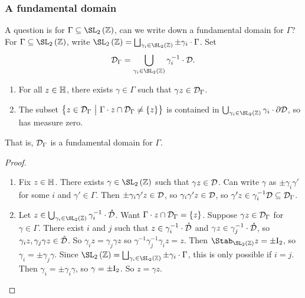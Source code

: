 \pagebreak

\subsubsection{A fundamental domain}

A question is for $ \Gamma \subseteq \SL_2\br{\ZZ} $, can we write down a fundamental domain for $ \Gamma $? For $ \Gamma \subseteq \SL_2\br{\ZZ} $, write $ \SL_2\br{\ZZ} = \bigsqcup_{\gamma_i \in \SL_2\br{\ZZ}} \pm\gamma_i \cdot \Gamma $. Set
$$ \DDD_\Gamma = \bigcup_{\gamma_i \in \SL_2\br{\ZZ}} \gamma_i^{-1} \cdot \DDD. $$

\begin{theorem}
\hfill
\begin{enumerate}
\item For all $ z \in \mathbb{H} $, there exists $ \gamma \in \Gamma $ such that $ \gamma z \in \mathcal{D}_\Gamma $.
\item The subset $ \cbr{z \in \DDD_\Gamma \st \Gamma \cdot z \cap \DDD_\Gamma \ne \cbr{z}} $ is contained in $ \bigcup_{\gamma_i \in \SL_2\br{\ZZ}} \gamma_i \cdot \partial\DDD $, so has measure zero.
\end{enumerate}
That is, $ \mathcal{D}_\Gamma $ is a fundamental domain for $ \Gamma $.
\end{theorem}

\begin{proof}
\hfill
\begin{enumerate}
\item Fix $ z \in \mathbb{H} $. There exists $ \gamma \in \SL_2\br{\ZZ} $ such that $ \gamma z \in \mathcal{D} $. Can write $ \gamma $ as $ \pm\gamma_i\gamma' $ for some $ i $ and $ \gamma' \in \Gamma $. Then $ \pm\gamma_i\gamma'z \in \mathcal{D} $, so $ \gamma_i\gamma'z \in \mathcal{D} $, so $ \gamma'z \in \gamma_i^{-1}\mathcal{D} \subseteq \mathcal{D}_\Gamma $.
\item Let $ z \in \bigcup_{\gamma_i \in \SL_2\br{\ZZ}} \gamma_i^{-1} \cdot \mathring{\DDD} $. Want $ \Gamma \cdot z \cap \DDD_\Gamma = \cbr{z} $. Suppose $ \gamma z \in \mathcal{D}_\Gamma $ for $ \gamma \in \Gamma $. There exist $ i $ and $ j $ such that $ z \in \gamma_i^{-1} \cdot \mathring{\mathcal{D}} $ and $ \gamma z \in \gamma_j^{-1} \cdot \mathring{\mathcal{D}} $, so $ \gamma_iz, \gamma_j\gamma z \in \mathring{\mathcal{D}} $. So $ \gamma_iz = \gamma_j\gamma z $ so $ \gamma^{-1}\gamma_j^{-1}\gamma_iz = z $. Then $ \Stab_{\SL_2\br{\ZZ}} z = \pm\I_2 $, so $ \gamma_i = \pm\gamma_j\gamma $. Since $ \SL_2\br{\ZZ} = \bigsqcup_{\gamma_i \in \SL_2\br{\ZZ}} \pm\gamma_i \cdot \Gamma $, this is only possible if $ i = j $. Then $ \gamma_i = \pm\gamma_i\gamma $, so $ \gamma = \pm\mathrm{I}_2 $. So $ z = \gamma z $.
\end{enumerate}
\end{proof}

